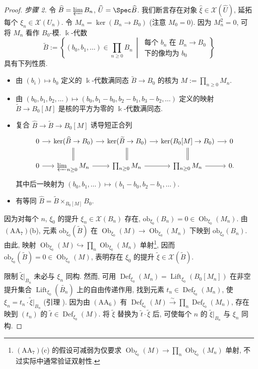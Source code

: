\begin{proof}
\textit{步骤 2.} 令 $\widehat B=\varprojlim B_n$, $\widehat U=\Spec\widehat B$. 我们断言存在对象 $\widehat\xi\in\mathcal X(\widehat U)$, 延拓每个 $\xi_n\in\mathcal X(U_n)$. 令 $M_n=\ker(B_n\to B_0)$ (注意 $M_0=0$). 因为 $M_n^2=0$, 可将 $M_n$ 看作 $B_0$-模. $\Bbbk$-代数
\[
\widetilde B:=\left\{(b_0,b_1,\ldots)\in\prod_{n\geq0}B_n\ \middle|\ \begin{gathered}\text{每个 }b_n\text{ 在 }B_n\to B_0\\\text{下的像均为 }b_0\end{gathered}\right\}
\]
具有下列性质.
\begin{itemize}
\item 由 $(b_i)\mapsto b_0$ 定义的 $\Bbbk$-代数满同态 $\widetilde B\to B_0$ 的核为 $M:=\prod_{n\geq0}M_n$.
\item 由 $(b_0,b_1,b_2,\ldots)\mapsto(b_0,b_1-b_0,b_2-b_1,b_3-b_2,\ldots)$ 定义的映射 $\widetilde B\to B_0[M]$ 是核的平方为零的 $\Bbbk$-代数满同态.
\item 复合 $\widehat B\to\widetilde B\to B_0[M]$ 诱导短正合列
\[
\begin{tikzcd}[column sep=small]
0\arrow[r]&\ker(\widehat B\to B_0)\arrow[r]\arrow[d,equal]&\ker(\widetilde B\to B_0)\arrow[r]\arrow[d,equal]&\ker(B_0[M]\to B_0)\arrow[r]\arrow[d,equal]&0\\
0\arrow[r]&\varprojlim_{n\geq0}M_n\arrow[r]&\prod_{n\geq0}M_n\arrow[r]&\prod_{n\geq0}M_n\arrow[r]&0.
\end{tikzcd}
\]
其中后一映射为 $(b_0,b_1,\ldots)\mapsto(b_1-b_0,b_2-b_1,\ldots)$.
\item 有等同 $\widehat B=\widetilde B\times_{B_0[M]}B_0$.
\end{itemize}
因为对每个 $n$, $\xi_0$ 的提升 $\xi_n\in\mathcal X(B_n)$ 存在, $\mathrm{ob}_{\xi_0}(B_n)=0\in\operatorname{Ob}_{\xi_0}(M_n)$. 由 $(\mathrm{AA}_7)$(b), 元素 $\mathrm{ob}_{\xi_0}(\widetilde B)$ 在 $\operatorname{Ob}_{\xi_0}(M)\to\operatorname{Ob}_{\xi_0}(M_n)$ 下映到 $\mathrm{ob}_{\xi_0}(B_n)$. 由此, 映射 $\operatorname{Ob}_{\xi_0}(M)\hookrightarrow\prod_n\operatorname{Ob}_{\xi_0}(M_n)$ 单射\footnote{$(\mathrm{AA}_7)$(c) 的假设可减弱为仅要求 $\operatorname{Ob}_{\xi_0}(M)\to\prod_n\operatorname{Ob}_{\xi_0}(M_n)$ 单射, 不过实际中通常验证双射性.}, 因而 $\mathrm{ob}_{\xi_0}(\widetilde B)=0\in\operatorname{Ob}_{\xi_0}(M)$, 表明存在 $\xi_0$ 的提升 $\widetilde\xi\in\mathcal X(\widetilde B)$.

限制 $\widetilde\xi|_{B_n}$ 未必与 $\xi_n$ 同构. 然而, 可用 $\operatorname{Def}_{\xi_0}(M_n)=\operatorname{Lift}_{\xi_0}(B_0[M_n])$ 在非空提升集合 $\operatorname{Lift}_{\xi_0}(\widetilde{B_n})$ 上的自由传递作用, 找到元素 $t_n\in\operatorname{Def}_{\xi_0}(M_n)$, 使 $\xi_n=t_n\cdot\widetilde\xi|_{B_n}$ (引理 ). 因为由 $(\mathrm{AA}_6)$ 有 $\operatorname{Def}_{\xi_0}(M)\xrightarrow\sim\prod_n\operatorname{Def}_{\xi_0}(M_n)$, 存在映到 $(t_n)$ 的 $\widetilde t\in\operatorname{Def}_{\xi_0}(M)$. 将 $\widetilde\xi$ 替换为 $\widetilde t\cdot\widetilde\xi$ 后, 可使每个 $n$ 的 $\widetilde\xi|_{B_n}$ 与 $\xi_n$ 同构.


\end{proof}
